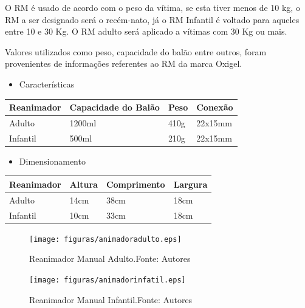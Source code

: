 O RM é usado de acordo com o peso da vítima, se esta tiver menos de 10 kg, o RM a ser designado será o recém-nato, já o RM Infantil é voltado para aqueles entre 10 e 30 Kg. O RM adulto será aplicado a vítimas com 30 Kg ou mais.

Valores utilizados como peso, capacidade do balão entre outros, foram provenientes de informações referentes ao RM da marca Oxigel.

\begin{itemize}
	\item Características
\end{itemize}

\begin{table}[H]
\begin{tabular}{|l|l|l|l|}
\hline
\multicolumn{1}{|c|}{Reanimador} & Capacidade do Balão & Peso & Conexão \\ \hline
Adulto                           & 1200ml              & 410g & 22x15mm \\ \hline
Infantil                         & 500ml               & 210g & 22x15mm \\ \hline
\end{tabular}
\end{table}


\begin{itemize}
	\item Dimensionamento
\end{itemize}

\begin{table}[H]
\begin{tabular}{|l|l|l|l|}
\hline
\multicolumn{1}{|c|}{Reanimador} & Altura & Comprimento & Largura \\ \hline
Adulto                           & 14cm   & 38cm        & 18cm    \\ \hline
Infantil                         & 10cm   & 33cm        & 18cm    \\ \hline
\end{tabular}
\end{table}


\begin{figure}[H]
	\centering
	  \texttt{[image: figuras/animadoradulto.eps]}
	\caption{Reanimador Manual Adulto.Fonte: Autores}
	\label{fig:animadoradulto}
\end{figure}

\begin{figure}[H]
	\centering
	  \texttt{[image: figuras/animadorinfatil.eps]}
	\caption{ Reanimador Manual Infantil.Fonte: Autores}
	\label{fig:animadorinfatil}
\end{figure}


